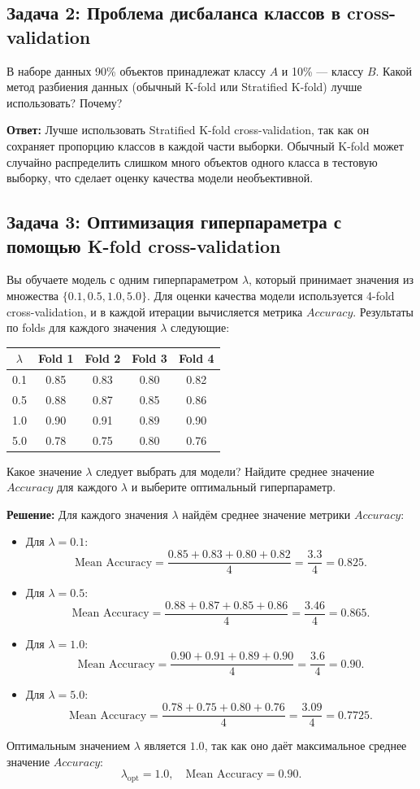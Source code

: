 \subsection*{Задача 2: Проблема дисбаланса классов в cross-validation}
В наборе данных 90\% объектов принадлежат классу $A$ и 10\% — классу $B$. Какой метод разбиения данных (обычный K-fold или Stratified K-fold) лучше использовать? Почему?

\textbf{Ответ:}
Лучше использовать Stratified K-fold cross-validation, так как он сохраняет пропорцию классов в каждой части выборки. Обычный K-fold может случайно распределить слишком много объектов одного класса в тестовую выборку, что сделает оценку качества модели необъективной.

\subsection*{Задача 3: Оптимизация гиперпараметра с помощью K-fold cross-validation}
Вы обучаете модель с одним гиперпараметром $\lambda$, который принимает значения из множества $\{0.1, 0.5, 1.0, 5.0\}$. Для оценки качества модели используется 4-fold cross-validation, и в каждой итерации вычисляется метрика $Accuracy$. Результаты по folds для каждого значения $\lambda$ следующие:

\begin{tabular}{|c|c|c|c|c|}
\hline
$\lambda$ & Fold 1 & Fold 2 & Fold 3 & Fold 4 \\ \hline
0.1       & 0.85   & 0.83   & 0.80   & 0.82   \\ \hline
0.5       & 0.88   & 0.87   & 0.85   & 0.86   \\ \hline
1.0       & 0.90   & 0.91   & 0.89   & 0.90   \\ \hline
5.0       & 0.78   & 0.75   & 0.80   & 0.76   \\ \hline
\end{tabular}

Какое значение $\lambda$ следует выбрать для модели? Найдите среднее значение $Accuracy$ для каждого $\lambda$ и выберите оптимальный гиперпараметр.

\textbf{Решение:}
Для каждого значения $\lambda$ найдём среднее значение метрики $Accuracy$:
\begin{itemize}
    \item Для $\lambda = 0.1$:
    \[
    \text{Mean Accuracy} = \frac{0.85 + 0.83 + 0.80 + 0.82}{4} = \frac{3.3}{4} = 0.825.
    \]
    \item Для $\lambda = 0.5$:
    \[
    \text{Mean Accuracy} = \frac{0.88 + 0.87 + 0.85 + 0.86}{4} = \frac{3.46}{4} = 0.865.
    \]
    \item Для $\lambda = 1.0$:
    \[
    \text{Mean Accuracy} = \frac{0.90 + 0.91 + 0.89 + 0.90}{4} = \frac{3.6}{4} = 0.90.
    \]
    \item Для $\lambda = 5.0$:
    \[
    \text{Mean Accuracy} = \frac{0.78 + 0.75 + 0.80 + 0.76}{4} = \frac{3.09}{4} = 0.7725.
    \]
\end{itemize}

Оптимальным значением $\lambda$ является $1.0$, так как оно даёт максимальное среднее значение $Accuracy$:
\[
\lambda_{\text{opt}} = 1.0, \quad \text{Mean Accuracy} = 0.90.
\]

